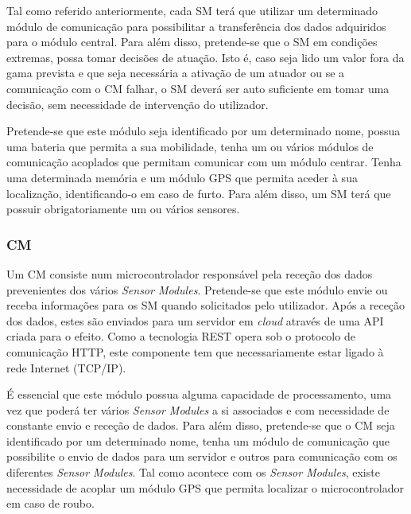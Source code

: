 Tal como referido anteriormente, cada \acl{SM} terá que utilizar um determinado módulo de comunicação para possibilitar a transferência dos dados adquiridos para o módulo central. Para além disso, pretende-se que o \acl{SM} em condições extremas, possa tomar decisões de atuação. Isto é, caso seja lido um valor fora da gama prevista e que seja necessária a ativação de um atuador ou se a comunicação com o \acl{CM} falhar, o \acl{SM} deverá ser auto suficiente em tomar uma decisão, sem necessidade de intervenção do utilizador. 

Pretende-se que este módulo seja identificado por um determinado nome, possua uma bateria que permita a sua mobilidade, tenha um ou vários módulos de comunicação acoplados que permitam comunicar com um módulo centrar. Tenha uma determinada memória e um módulo \ac{GPS} que permita aceder à sua localização, identificando-o em caso de furto. Para além disso, um \acl{SM} terá que possuir obrigatoriamente um ou vários sensores.








\subsubsection{\acl{CM}}



Um \acl{CM} consiste num microcontrolador responsável pela receção dos dados prevenientes dos vários \textit{Sensor Modules}. Pretende-se que este módulo envie ou receba informações para os \acl{SM} quando solicitados pelo utilizador. Após a receção dos dados, estes são enviados para um servidor em \textit{cloud} através de uma \ac{API} criada para o efeito. Como a tecnologia \ac{REST} opera sob o protocolo de comunicação \ac{HTTP}, este componente tem que necessariamente estar ligado à rede Internet (\ac{TCP}/\ac{IP}). 

É essencial que este módulo possua alguma capacidade de processamento, uma vez que poderá ter vários \textit{Sensor Modules} a si associados e com necessidade de constante envio e receção de dados.  Para além disso, pretende-se que o \acl{CM} seja identificado por um determinado nome, tenha um  módulo de comunicação que possibilite o envio de dados para um servidor e outros para comunicação com os diferentes \textit{Sensor Modules}. Tal como acontece com os \textit{Sensor Modules}, existe necessidade de acoplar um módulo \ac{GPS} que permita localizar o microcontrolador em caso de roubo.
 






